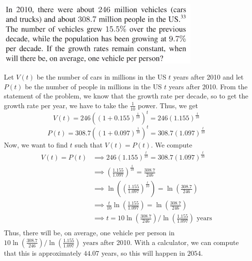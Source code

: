 \documentclass[11pt]{exam}
\begin{document}
\begin{questions}
\begin{parts}
        \includegraphics[width=4in]{no53.jpg}
        \begin{solution}
          Let \(V(t)\) be the number of cars in millions in the US \(t\) years after 2010
          and let \(P(t)\) be the number of people in millions in the US \(t\)
          years after 2010. From the statement of the problem, we know
          that the growth rate per decade, so to get the growth rate
          per year, we have to take the \(\frac{1}{10}\) power. Thus,
          we get \[
            V(t) = 246((1+0.155)^{\frac{1}{10}})^t =
            246(1.155)^{\frac{t}{10}}
            \]\[
            P(t) = 308.7((1+0.097)^{\frac{1}{10}})^t = 308.7(1.097)^{\frac{t}{10}}
          \]
          Now, we want to find \(t\) such that \(V(t) = P(t)\). We
          compute
          \begin{align*}
            V(t) = P(t)
            & \implies 246(1.155)^{\frac{t}{10}} =
                          308.7(1.097)^{\frac{t}{10}} \\
           & \implies \left( \frac{1.155}{1.097}
             \right)^{\frac{t}{10}} = \frac{308.7}{246}\\
           & \implies \ln\left(  \left( \frac{1.155}{1.097}
             \right)^{\frac{t}{10}} \right) = \ln\left(\frac{308.7}{246}\right)\\
           & \implies \frac{t}{10}\ln\left(   \frac{1.155}{1.097}
             \right)  = \ln\left(\frac{308.7}{246}\right)\\
           & \implies t 
             = 10 \ln\left(\frac{308.7}{246}\right) /
             \ln\left(   \frac{1.155}{1.097} \right) \text{ years}\\
          \end{align*}
          Thus, there will be, on average, one vehicle per person in \(10 \ln\left(\frac{308.7}{246}\right) /
             \ln\left(   \frac{1.155}{1.097} \right) \text{ years}\)
             after 2010.
          With a calculator, we can compute that this is approximately
          \(44.07\) years, so this will happen in \(2054\).
        \end{solution}
      \end{parts}
      \vspace{1.5in}

\end{questions}
\end{document}
